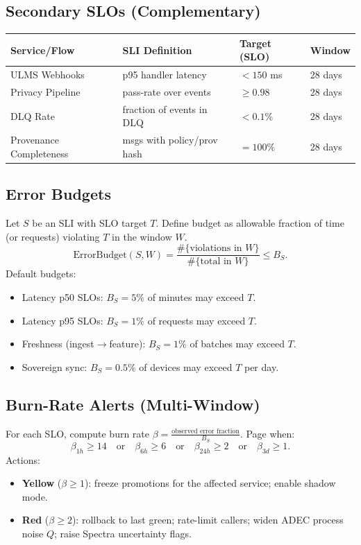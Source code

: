 \documentclass[11pt]{article}
\theoremstyle{plain}
\begin{document}
\subsection{Secondary SLOs (Complementary)}
\begin{center}
\begin{tabular}{l l l l}
\hline
\textbf{Service/Flow} & \textbf{SLI Definition} & \textbf{Target (SLO)} & \textbf{Window} \\
\hline
ULMS Webhooks & p95 handler latency & $<150$ ms & 28 days \\
Privacy Pipeline & pass-rate over events & $\ge 0.98$ & 28 days \\
DLQ Rate & fraction of events in DLQ & $<0.1\%$ & 28 days \\
Provenance Completeness & msgs with policy/prov hash & $=100\%$ & 28 days \\
\hline
\end{tabular}
\end{center}

\subsection{Error Budgets}
Let $S$ be an SLI with SLO target $T$. Define budget as allowable fraction of time (or requests) violating $T$ in the window $W$.
\[
\text{ErrorBudget}(S,W)=\frac{\#\{\text{violations in }W\}}{\#\{\text{total in }W\}}\le B_S.
\]
Default budgets:
\begin{itemize}
  \item Latency p50 SLOs: $B_S=5\%$ of minutes may exceed $T$.
  \item Latency p95 SLOs: $B_S=1\%$ of requests may exceed $T$.
  \item Freshness (ingest$\rightarrow$feature): $B_S=1\%$ of batches may exceed $T$.
  \item Sovereign sync: $B_S=0.5\%$ of devices may exceed $T$ per day.
\end{itemize}

\subsection{Burn-Rate Alerts (Multi-Window)}
For each SLO, compute burn rate $\beta=\frac{\text{observed error fraction}}{B_S}$. Page when:
\[
\beta_{1h}\ge 14 \quad \text{or} \quad \beta_{6h}\ge 6 \quad \text{or} \quad \beta_{24h}\ge 2 \quad \text{or} \quad \beta_{3d}\ge 1.
\]
Actions:
\begin{itemize}
  \item \textbf{Yellow} ($\beta\ge 1$): freeze promotions for the affected service; enable shadow mode.
  \item \textbf{Red} ($\beta\ge 2$): rollback to last green; rate-limit callers; widen ADEC process noise $Q$; raise Spectra uncertainty flags.
\end{itemize}
\end{document}
